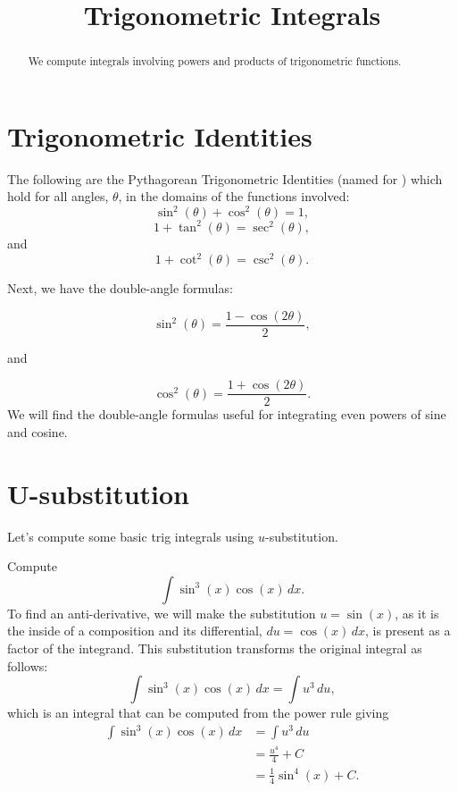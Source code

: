 \documentclass{ximera}
\title{Trigonometric Integrals}
\begin{document}
\begin{abstract}
We compute integrals involving powers and products of trigonometric functions.
\end{abstract}

\maketitle

\section{Trigonometric Identities}

The following are the Pythagorean Trigonometric Identities (named for ) which hold for all angles,
$\theta$, in the domains of the functions involved:
\[
\sin^2(\theta) + \cos^2(\theta) = 1,
\]
\[
1 + \tan^2(\theta) = \sec^2(\theta),
\]
and
\[
1 + \cot^2(\theta) = \csc^2(\theta).
\]

Next, we have the double-angle formulas:

\[
\sin^2(\theta) = \frac{1-\cos(2\theta)}{2},
\]

and

\[
\cos^2(\theta) = \frac{1+\cos(2\theta)}{2}.
\]
We will find the double-angle formulas useful for integrating even powers of sine and cosine.

\section{U-substitution}
Let's compute some basic trig integrals using $u$-substitution.

\begin{example}
Compute
\[
\int \sin^3(x) \cos(x) \, dx.
\]
To find an anti-derivative, we will make the substitution $u = \sin(x)$, as it is the inside of a composition
and its differential, $du = \cos(x) \, dx$, is present as a factor of the integrand. 
This substitution transforms the original integral as follows:
\[
\int \sin^3(x) \cos(x) \, dx = \int u^3 \, du,
\]
which is an integral that can be computed from the power rule giving
\begin{align*}
\int \sin^3(x) \cos(x) \, dx &= \int u^3 \, du\\
                             &= \frac{u^4}{4} + C\\
                             &= \frac14 \sin^4(x) + C.
\end{align*}

\end{example}
\end{document}
